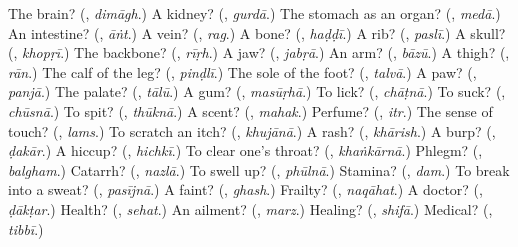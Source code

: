 \begin{tcolorbox}[breakable,colback=teal!4,colframe=teal!35!black,title={Before you move on}]
The brain? (\textbf{}, \emph{dimāgh}.) A kidney? (\textbf{}, \emph{gurdā}.) The stomach as an organ? (\textbf{}, \emph{medā}.) An intestine? (\textbf{}, \emph{āṅt}.) A vein? (\textbf{}, \emph{rag}.) A bone? (\textbf{}, \emph{haḍḍī}.) A rib? (\textbf{}, \emph{paslī}.) A skull? (\textbf{}, \emph{khopṛī}.) The backbone? (\textbf{}, \emph{rīṛh}.) A jaw? (\textbf{}, \emph{jabṛā}.) An arm? (\textbf{}, \emph{bāzū}.) A thigh? (\textbf{}, \emph{rān}.) The calf of the leg? (\textbf{}, \emph{pinḍlī}.) The sole of the foot? (\textbf{}, \emph{talvā}.) A paw? (\textbf{}, \emph{panjā}.) The palate? (\textbf{}, \emph{tālū}.) A gum? (\textbf{}, \emph{masūṛhā}.) To lick? (\textbf{}, \emph{chāṭnā}.) To suck? (\textbf{}, \emph{chūsnā}.) To spit? (\textbf{}, \emph{thūknā}.) A scent? (\textbf{}, \emph{mahak}.) Perfume? (\textbf{}, \emph{itr}.) The sense of touch? (\textbf{}, \emph{lams}.) To scratch an itch? (\textbf{}, \emph{khujānā}.) A rash? (\textbf{}, \emph{khārish}.) A burp? (\textbf{}, \emph{ḍakār}.) A hiccup? (\textbf{}, \emph{hichkī}.) To clear one's throat? (\textbf{}, \emph{khaṅkārnā}.) Phlegm? (\textbf{}, \emph{balgham}.) Catarrh? (\textbf{}, \emph{nazlā}.) To swell up? (\textbf{}, \emph{phūlnā}.) Stamina? (\textbf{}, \emph{dam}.) To break into a sweat? (\textbf{}, \emph{pasījnā}.) A faint? (\textbf{}, \emph{ghash}.) Frailty? (\textbf{}, \emph{naqāhat}.) A doctor? (\textbf{}, \emph{ḍākṭar}.) Health? (\textbf{}, \emph{sehat}.) An ailment? (\textbf{}, \emph{marz}.) Healing? (\textbf{}, \emph{shifā}.) Medical? (\textbf{}, \emph{tibbī}.)
\end{tcolorbox}
